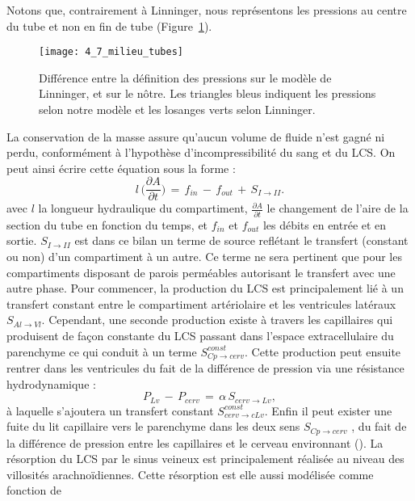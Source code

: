 Notons que, contrairement à Linninger, nous représentons les pressions au centre du tube et non
en fin de tube (Figure~\ref{fig:4_7_milieu_tubes}).

\begin{figure}[!t]
\centering
\texttt{[image: 4\_7\_milieu\_tubes]}
\caption{Différence entre la définition des pressions sur le modèle de Linninger, et sur le nôtre. Les triangles bleus
indiquent les pressions selon notre modèle et les losanges verts selon Linninger.}
\label{fig:4_7_milieu_tubes}	
\end{figure}
La conservation de la masse assure qu’aucun volume de fluide n’est gagné ni perdu,
conformément à l’hypothèse d’incompressibilité du sang et du LCS. On peut ainsi écrire cette équation
sous la forme :
\begin{equation}
l\,\biggr(\frac{\partial A}{\partial t}\biggr)\,=\,f_{in}\,-\,f_{out}\,+\,S_{I\rightarrow II}.
\end{equation}
avec $l$ la longueur hydraulique du compartiment, $\frac{\partial A}{\partial t}$
le changement de l’aire de la section du tube en
fonction du temps, et $f_{in}$ et $f_{out}$ les débits en entrée et en sortie. $S_{I \rightarrow II}$ est dans ce bilan un terme de
source reflétant le transfert (constant ou non) d’un compartiment à un autre. Ce terme ne sera
pertinent que pour les compartiments disposant de parois perméables autorisant le transfert avec une autre phase. Pour commencer, la production du LCS est principalement lié à un transfert constant
entre le compartiment artériolaire et les ventricules latéraux $S_{Al\rightarrow Vl}$. Cependant, une seconde
production existe à travers les capillaires qui produisent de façon constante du LCS passant dans
l’espace extracellulaire du parenchyme ce qui conduit à un terme $S^{const}_{Cp\rightarrow cerv}$. Cette production peut
ensuite rentrer dans les ventricules du fait de la différence de pression via une résistance
hydrodynamique :
\begin{equation}
P_{Lv}\,-\,P_{cerv}\,=\,\alpha\,S_{cerv\rightarrow Lv},
\end{equation}
à laquelle s’ajoutera un transfert constant $S^{const}_{cerv\rightarrow cLv}$. Enfin il peut exister une fuite du lit capillaire
vers le parenchyme dans les deux sens $S_{Cp\rightarrow cerv}$ , du fait de la différence de pression entre les capillaires
et le cerveau environnant (\cite{Starling1896}). La résorption du LCS par le sinus veineux est principalement réalisée
au niveau des villosités arachnoïdiennes. Cette résorption est elle aussi modélisée comme fonction de
